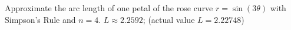 {Approximate the arc length of one petal of the rose curve $r=\sin(3\theta)$ with Simpson's Rule and $n=4.$
}
{$L\approx 2.2592$; (actual value $L=2.22748$)
}
